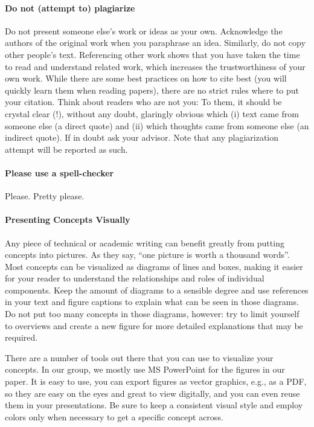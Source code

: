 \documentclass[a4]{article}
\begin{document}
\paragraph{Do not (attempt to) plagiarize}
\label{subsec:plags}
Do not present someone else's work or ideas as your own.
Acknowledge the authors of the original work when you paraphrase an idea.
Similarly, do not copy other people's text.
Referencing other work shows that you have taken the time to read and understand related work, which increases the trustworthiness of your own work.
While there are some best practices on how to cite best (you will quickly learn them when reading papers), there are no strict rules where to put your citation.
Think about readers who are not you: To them, it should be crystal clear (!), without any doubt, glaringly obvious which (i) text came from someone else (a direct quote) and (ii) which thoughts came from someone else (an indirect quote).
If in doubt ask your advisor.
Note that any plagiarization attempt will be reported as such.

\paragraph{Please use a spell-checker}
Please.
Pretty please.

\paragraph{Presenting Concepts Visually}

Any piece of technical or academic writing can benefit greatly from putting concepts into pictures.
As they say, ``one picture is worth a thousand words''.
Most concepts can be visualized as diagrams of lines and boxes, making it easier for your reader to understand the relationships and roles of individual components.
Keep the amount of diagrams to a sensible degree and use references in your text and figure captions to explain what can be seen in those diagrams.
Do not put too many concepts in those diagrams, however: try to limit yourself to overviews and create a new figure for more detailed explanations that may be required.

There are a number of tools out there that you can use to visualize your concepts.
In our group, we mostly use MS PowerPoint for the figures in our paper.
It is easy to use, you can export figures as vector graphics, e.g., as a PDF, so they are easy on the eyes and great to view digitally, and you can even reuse them in your presentations.
Be sure to keep a consistent visual style and employ colors only when necessary to get a specific concept across.
\end{document}
